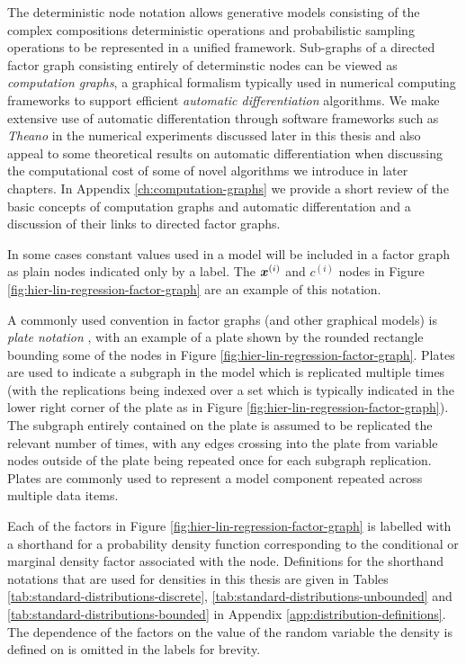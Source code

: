 The deterministic node notation allows generative models consisting of the complex compositions deterministic operations and probabilistic sampling operations to be represented in a unified framework. Sub-graphs of a directed factor graph consisting entirely of determinstic nodes can be viewed as \emph{computation graphs}, a graphical formalism typically used in numerical computing frameworks to support efficient \emph{automatic differentiation} algorithms. We make extensive use of automatic differentation through software frameworks such as \emph{Theano} \citep{theano2016theano} in the numerical experiments discussed later in this thesis and also appeal to some theoretical results on automatic differentiation when discussing the computational cost of some of novel algorithms we introduce in later chapters. In Appendix \ref{ch:computation-graphs} we provide a short review of the basic concepts of computation graphs and automatic differentation and a discussion of their links to directed factor graphs.

In some cases constant values used in a model will be included in a factor graph as plain nodes indicated only by a label. The $\boldsymbol{x}^{(i)}$ and $c^{(i)}$ nodes in Figure \ref{fig:hier-lin-regression-factor-graph} are an example of this notation.

A commonly used convention in factor graphs (and other graphical models) is \emph{plate notation} \citep{buntine1994operations}, with an example of a plate shown by the rounded rectangle bounding some of the nodes in Figure \ref{fig:hier-lin-regression-factor-graph}. Plates are used to indicate a subgraph in the model which is replicated multiple times (with the replications being indexed over a set which is typically indicated in the lower right corner of the plate as in Figure \ref{fig:hier-lin-regression-factor-graph}). The subgraph entirely contained on the plate is assumed to be replicated the relevant number of times, with any edges crossing into the plate from variable nodes outside of the plate being repeated once for each subgraph replication. Plates are commonly used to represent a model component repeated across multiple data items.

Each of the factors in Figure \ref{fig:hier-lin-regression-factor-graph} is labelled with a shorthand for a probability density function corresponding to the conditional or marginal density factor associated with the node. Definitions for the shorthand notations that are used for densities in this thesis are given in Tables \ref{tab:standard-distributions-discrete}, \ref{tab:standard-distributions-unbounded} and \ref{tab:standard-distributions-bounded} in Appendix \ref{app:distribution-definitions}. The dependence of the factors on the value of the random variable the density is defined on is omitted in the labels for brevity.

